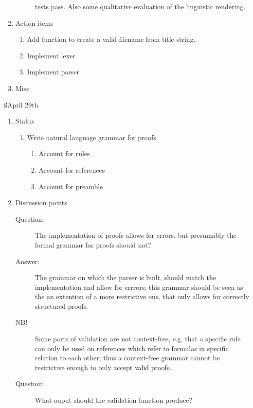 \documentclass[a4paper]{article}
\begin{document}
\begin{enumerate}
\begin{description}
      tests pass. 
      Also some qualitative evaluation of the linguistic rendering.
    \end{description}
  \item Action items
    \begin{enumerate}[\HollowBox]
      \item Add function to create a valid filename from title string.
      \item Implement lexer
      \item Implement parser
    \end{enumerate}
  \item Misc
\end{enumerate}

\ss{April 29th}
\begin{enumerate}
  \item Status
    \begin{enumerate}[\HollowBox]
      \item[\Checkedbox] Write natural language grammar for proofs
        \begin{enumerate}[\HollowBox]
          \item[\Checkedbox] Account for rules
          \item[\Checkedbox] Account for references
          \item[\Checkedbox] Account for preamble
        \end{enumerate}
    \end{enumerate}
  \item Discussion points
    \begin{description}
      \item[Question:] The implementation of proofs allows for errors, but
      presumably the formal grammar for proofs should not?
      \item[Answer:] The grammar on which the parser is built, should match
      the implementation and allow for errrors; this grammar should be seen
      as the an extention of a more restrictive one, that only allows for
      correctly structured proofs.
      \item[NB!] Some parts of validation are not context-free, e.g. that
      a specific rule can only be used on references which refer to formulas
      in specific relation to each other; thus a context-free grammar cannot
      be restrictive enough to only accept valid proofs.
      \item[Question:] What ouput should the validation function produce?\\

\end{description}
\end{enumerate}
\end{document}
